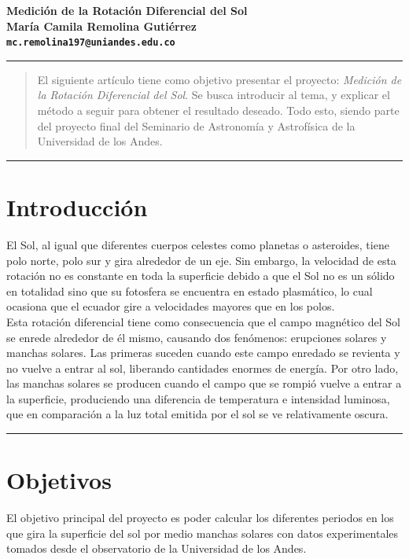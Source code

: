 \documentclass[11pt,letterpaper]{article}
\begin{document}
\begin{center}
{{\huge \textbf{Medición de la Rotación Diferencial del Sol} \\ 
\singlespacing 
{\large \textbf{María Camila Remolina Gutiérrez\\ 
\normalsize 
\texttt{mc.remolina197@uniandes.edu.co}\\
 }}}}
\end{center}

\hrule

\begin{abstract}
El siguiente artículo tiene como objetivo presentar el proyecto: \textit{Medición de la Rotación Diferencial del Sol}. Se busca introducir al tema, y explicar el método a seguir para obtener el resultado deseado. Todo esto, siendo parte del proyecto final del Seminario de Astronomía y Astrofísica de la Universidad de los Andes.
\\
\end{abstract}

\hrule

\section{Introducción}
El Sol, al igual que diferentes cuerpos celestes como planetas o asteroides, tiene polo norte, polo sur y gira alrededor de un eje. Sin embargo, la velocidad de esta rotación no es constante en toda la superficie debido a que el Sol no es un sólido en totalidad sino que su fotosfera se encuentra en estado plasmático, lo cual ocasiona que el ecuador gire a velocidades mayores que en los polos. 
\\

Esta rotación diferencial tiene como consecuencia que el campo magnético del Sol se enrede alrededor de él mismo, causando dos fenómenos: erupciones solares y manchas solares. Las primeras suceden cuando este campo enredado se revienta y no vuelve a entrar al sol, liberando cantidades enormes de energía. Por otro lado, las manchas solares se producen cuando el campo que se rompió vuelve a entrar a la superficie, produciendo una diferencia de temperatura e intensidad luminosa, que en comparación a la luz total emitida por el sol se ve relativamente oscura.
\\

\hrule

\section{Objetivos}
El objetivo principal del proyecto es poder calcular los diferentes periodos en los que gira la superficie del sol por medio manchas solares con datos experimentales tomados desde el observatorio de la Universidad de los Andes.\\
\end{document}
